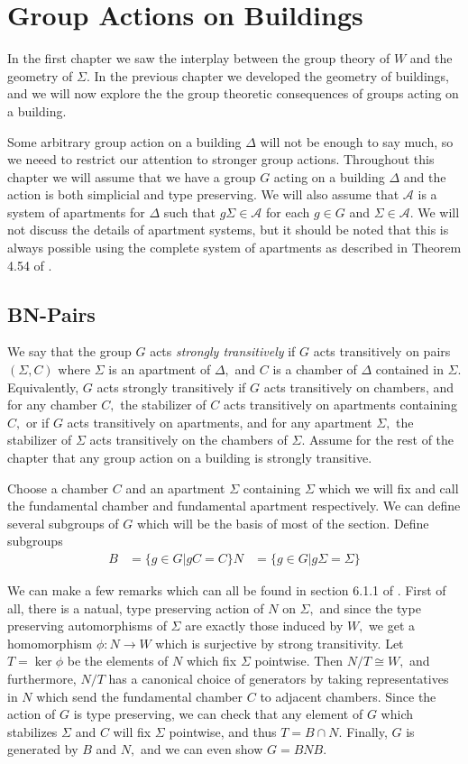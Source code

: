 \documentclass[class=book, crop=false,12 pt]{standalone}
\begin{document}
\chapter{Group Actions on Buildings}
\label{ch:rgd}
In the first chapter we saw the interplay between the group theory of $W$ and the geometry of $\Sigma.$ In the previous chapter we developed the geometry of buildings, and we will now explore the the group theoretic consequences of groups acting on a building. 

Some arbitrary group action on a building $\Delta$ will not be enough to say much, so we neeed to restrict our attention to stronger group actions. Throughout this chapter we will assume that we have a group $G$ acting on a building $\Delta$ and the action is both simplicial and type preserving. We will also assume that $\mathcal{A}$ is a system of apartments for $\Delta$ such that $g\Sigma\in \mathcal{A}$ for each $g\in G$ and $\Sigma\in \mathcal{A}.$ We will not discuss the details of apartment systems, but it should be noted that this is always possible using the complete system of apartments as described in Theorem 4.54 of \cite{buildings}. 

\section{BN-Pairs}
We say that the group $G$ acts \emph{strongly transitively} if $G$ acts transitively on pairs $(\Sigma,C)$ where $\Sigma$ is an apartment of $\Delta,$ and $C$ is a chamber of $\Delta$ contained in $\Sigma.$ Equivalently, $G$ acts strongly transitively if $G$ acts transitively on chambers, and for any chamber $C,$ the stabilizer of $C$ acts transitively on apartments containing $C,$ or if $G$ acts transitively on apartments, and for any apartment $\Sigma,$ the stabilizer of $\Sigma$ acts transitively on the chambers of $\Sigma.$ Assume for the rest of the chapter that any group action on a building is strongly transitive.

Choose a chamber $C$ and an apartment $\Sigma$ containing $\Sigma$ which we will fix and call the fundamental chamber and fundamental apartment respectively. We can define several subgroups of $G$ which will be the basis of most of the section. Define subgroups
\begin{align*}
	B&=\{g\in G|gC=C\}
	N&=\{g\in G|g\Sigma=\Sigma\}
\end{align*}

We can make a few remarks which can all be found in section 6.1.1 of \cite{buildings}. First of all, there is a natual, type preserving action of $N$ on $\Sigma,$ and since the type preserving automorphisms of $\Sigma$ are exactly those induced by $W,$ we get a homomorphism $\phi:N\to W$ which is surjective by strong transitivity. Let $T=\ker \phi$ be the elements of $N$ which fix $\Sigma$ pointwise. Then $N/T\cong W,$ and furthermore, $N/T$ has a canonical choice of generators by taking representatives in $N$ which send the fundamental chamber $C$ to adjacent chambers. Since the action of $G$ is type preserving, we can check that any element of $G$ which stabilizes $\Sigma$ and $C$ will fix $\Sigma$ pointwise, and thus $T=B\cap N.$ Finally, $G$ is generated by $B$ and $N,$ and we can even show $G=BNB.$
\end{document}
